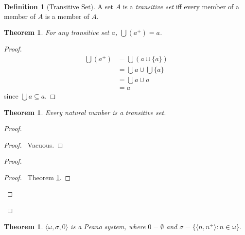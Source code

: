 \documentclass{article}
\let\qed\relax
\newtheorem{theorem}[axiom]{Theorem}
\theoremstyle{definition}
\newtheorem{definition}[axiom]{Definition}
\begin{document}
    \begin{definition}[Transitive Set]
        A set $A$ is a \emph{transitive set} iff every member of a member of $A$ is a member of $A$.
    \end{definition}

    \begin{theorem}
        \label{theorem:union_transitive_successor}
        For any transitive set $a$, $\bigcup (a^+) = a$.
    \end{theorem}

    \begin{proof}
        \pf
        \begin{align*}
            \bigcup (a^+) & = \bigcup (a \cup \{ a \}) \\
            & = \bigcup a \cup \bigcup \{a\} \\
            & = \bigcup a \cup a \\
            & = a
        \end{align*}
        since $\bigcup a \subseteq a$. \qed
    \end{proof}

    \begin{theorem}
        \label{theorem:natural_number_transitive}
        Every natural number is a transitive set.
    \end{theorem}

    \begin{proof}
        \pf
        \begin{proof}
            \pf\ Vacuous.
        \end{proof}
        \begin{proof}
            \begin{proof}
                \pf\ Theorem \ref{theorem:union_transitive_successor}.
            \end{proof}
        \end{proof}
        \qed
    \end{proof}

    \begin{theorem}
        $\langle \omega, \sigma, 0 \rangle$ is a Peano system, where $0 = \emptyset$ and 
        $\sigma = \{ \langle n, n^+ \rangle : n \in \omega \}$.
    \end{theorem}
\end{document}
